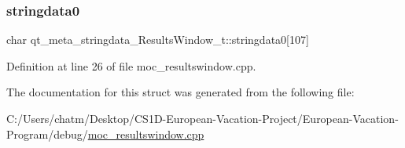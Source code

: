 \mbox{\label{structqt__meta__stringdata___results_window__t_a9018169b5e4fe41f90cdd2d40fd0db68}} 
\subsubsection{\texorpdfstring{stringdata0}{stringdata0}}
{\footnotesize\ttfamily char qt\+\_\+meta\+\_\+stringdata\+\_\+\+Results\+Window\+\_\+t\+::stringdata0\mbox{[}107\mbox{]}}



Definition at line 26 of file moc\+\_\+resultswindow.\+cpp.



The documentation for this struct was generated from the following file\+:\begin{DoxyCompactItemize}
\item 
C\+:/\+Users/chatm/\+Desktop/\+C\+S1\+D-\/\+European-\/\+Vacation-\/\+Project/\+European-\/\+Vacation-\/\+Program/debug/\mbox{\hyperlink{moc__resultswindow_8cpp}{moc\+\_\+resultswindow.\+cpp}}\end{DoxyCompactItemize}
